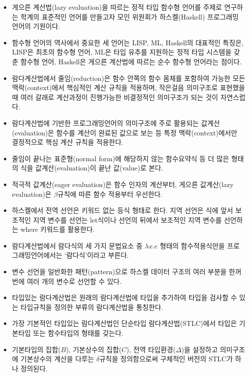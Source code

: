 \begin{itemize}
\tightlist
\item
  게으른 계산법(lazy evaluation)을 따르는 정적 타입 함수형 언어를 주제로
  연구하는 학계의 표준적인 언어를 만들고자 모인 위원회가 하스켈(Haskell)
  프로그래밍 언어의 기원이다.
\item
  함수형 언어의 역사에서 중요한 세 언어는 LISP, ML, Haskell의 대표적인
  특징은, LISP은 최초의 함수형 언어, ML은 타입 유추를 지원하는 정적 타입
  시스템을 갖춘 함수형 언어, Haskell은 게으른 계산법에 따르는 순수
  함수형 언어라는 점이다.
\item
  람다계산법에서 줄임(reduction)은 함수 안쪽의 함수 몸체를 포함하여
  가능한 모든 맥락(context)에서 핵심적인 계산 규칙을 적용하며, 작은걸음
  의미구조로 표현했을 때 여러 갈래로 계산과정이 진행가능한 비결정적인
  의미구조가 되는 것이 자연스럽다.
\item
  람다계산법에 기반한 프로그래밍언어의 의미구조에 주로 활용되는
  값계산(evaluation)은 함수를 계산이 완료된 값으로 보는 등 특정
  맥락(context)에서만 결정적으로 핵심 계산 규칙을 적용한다.
\item
  줄임이 끝나는 표준형(normal form)에 해당하지 않는 함수요약식 등 더
  많은 형태의 식을 값계산(evaluation)이 끝난 값(value)로 본다.
\item
  적극적 값계산(eager evaluation)은 함수 인자의 계산부터, 게으른
  값계산(lazy evaluation)은 \(\beta\)규칙에 따른 함수 적용부터 우선한다.
\item
  하스켈에서 전역 선언은 키워드 없는 등식 형태로 한다. 지역 선언은 식에
  앞서 보조적인 지역 변수를 선언는 let식이나 선언의 뒤에서 보조적인 지역
  변수를 선언하는 where 키워드를 활용한다.
\item
  람다계산법에서 람다식의 세 가지 문법요소 중 \(\lambda x.e\) 형태의
  함수적용식만을 프로그래밍언어에서는 `람다식'이라고 부른다.
\item
  변수 선언을 일반화한 패턴(pattern)으로 하스켈 데이터 구조의 여러
  부분을 한꺼번에 여러 개의 변수로 선언할 수 있다.
\item
  타입있는 람다계산법은 원래의 람다계산법에 타입을 추가하여 타입을
  검사할 수 있는 타입규칙을 정의한 부류의 람다계산법을 통칭한다.
\item
  가장 기본적인 타입있는 람다계산법인 단순타입 람다계산법(STLC)에서
  타입은 기본타입 또는 함수타입의 형태를 갖는다.
\item
  기본타입의 집합(\(B\)), 기본상수의 집합(\(C\)), 전역
  타입환경(\(\Delta\))을 설정하고 의미구조에 기본상수의 계산을 다루는
  \(\delta\)규칙을 정의함으로써 구체적인 버전의 STLC가 하나 정의된다.

\end{itemize}
